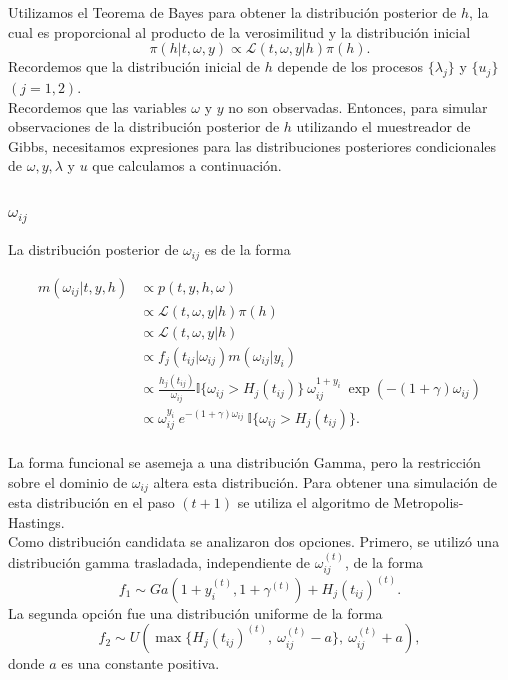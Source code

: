 \documentclass[11pt,a4paper]{article}
\begin{document}
Utilizamos el Teorema de Bayes para obtener la distribución posterior de $h$, la cual es proporcional al producto de la verosimilitud y la distribución inicial $$\pi(h | t, \omega, y) \propto \mathcal{L}(t, \omega, y | h) \pi(h).$$ Recordemos que la distribución inicial de $h$ depende de los procesos $\lbrace \lambda_j \rbrace$ y $\lbrace u_j \rbrace$ $(j = 1, 2)$.\\

Recordemos que las variables $\omega$ y $y$ no son observadas. Entonces, para simular observaciones de la distribución posterior de $h$ utilizando el muestreador de Gibbs, necesitamos expresiones para las distribuciones posteriores condicionales de $\omega, y, \lambda$ y $u$ que calculamos a continuación.

\subsubsection{$\omega_{ij}$}
\label{posterior_omega}

La distribución posterior de $\omega_{ij}$ es de la forma

\begin{align*}
m(\omega_{ij} | t, y, h) &\propto p(t, y, h, \omega)\\
&\propto \mathcal{L}(t, \omega, y |h) \pi(h)\\
&\propto \mathcal{L}(t, \omega, y |h)\\
&\propto f_j(t_{ij}|\omega_{ij})m(\omega_{ij}|y_i)\\
&\propto \frac{h_j(t_{ij})}{\omega_{ij}}\mathbb{I}\lbrace \omega_{ij} > H_j(t_{ij})\rbrace \  \omega_{ij}^{1+y_i} \ \exp (-(1+\gamma)\omega_{ij})\\
&\propto \omega_{ij}^{y_i} \ e^{-(1+\gamma)\omega_{ij}} \ \mathbb{I}\lbrace \omega_{ij} > H_j(t_{ij})\rbrace.\\
\end{align*}

La forma funcional se asemeja a una distribución Gamma, pero la restricción sobre el dominio de $\omega_{ij}$ altera esta distribución. Para obtener una simulación de esta distribución en el paso $(t+1)$ se utiliza el algoritmo de Metropolis-Hastings.\\

Como distribución candidata se analizaron dos opciones. Primero, se utilizó una distribución gamma trasladada, independiente de $\omega_{ij}^{(t)}$, de la forma $$f_1 \sim Ga(1 + y_i^{(t)}, 1 + \gamma^{(t)}) + H_j(t_{ij})^{(t)}.$$ La segunda opción fue una distribución uniforme de la forma $$f_2 \sim U(\max \lbrace H_j(t_{ij})^{(t)}, \ \omega_{ij}^{(t)} - a \rbrace, \ \omega_{ij}^{(t)} + a),$$ donde $a$ es una constante positiva.\\
\end{document}
